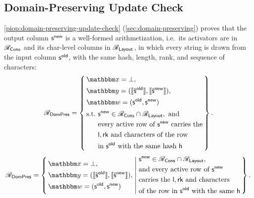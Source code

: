 \subsection{Domain-Preserving Update Check}
\label{sec:proof-domain-preserving}
\cref{piop:domain-preserving-update-check} (\cref{sec:domain-preserving}) proves that the output column $\mathsf{s}^{\mathsf{new}}$ is a well-formed arithmetization, i.e.\ its activators are in $\mathscr{R}_{\mathsf{Cons}}$ and its char-level columns in $\mathscr{R}_{\mathsf{Layout}}$, in which every string is drawn from the input column $\mathsf{s}^{\mathsf{old}}$, with the same hash, length, rank, and sequence of characters:
\ifsp
\begin{displaymath}
\NPRelation_{\mathsf{DomPres}} = \left\{\,
  \begin{aligned}
    & \NPInstance = \bot,\\
    & \NPInstancey = (\Oracle{\hat{\strcol}^{\mathsf{old}}}, \Oracle{\hat{\strcol}^{\mathsf{new}}}),\\
    & \NPWitness = (\strcol^{\mathsf{old}}, \strcol^{\mathsf{new}})\\[2pt]
    & \text{s.t.}\ \strcol^{\mathsf{new}} \in \NPRelation_{\mathsf{Cons}} \cap \NPRelation_{\mathsf{Layout}},\ \text{and}\\
    & \phantom{\text{s.t.}}\ \text{every active row of } \strcol^{\mathsf{new}} \text{ carries the}\\
    & \phantom{\text{s.t.}}\ \mathsf{l}, \mathsf{rk} \text{ and characters of the row}\\
    & \phantom{\text{s.t.}}\ \text{in } \strcol^{\mathsf{old}} \text{ with the same hash } \mathsf{h}
  \end{aligned}
\,\right\}.
\end{displaymath}
\else
\begin{displaymath}
\NPRelation_{\mathsf{DomPres}} = \left\{\,
  \begin{aligned}
    & \NPInstance = \bot,\\
    & \NPInstancey = (\Oracle{\hat{\strcol}^{\mathsf{old}}}, \Oracle{\hat{\strcol}^{\mathsf{new}}}),\\
    & \NPWitness = (\strcol^{\mathsf{old}}, \strcol^{\mathsf{new}})
  \end{aligned}
  \;\middle|\;
  \begin{aligned}
    & \strcol^{\mathsf{new}} \in \NPRelation_{\mathsf{Cons}} \cap \NPRelation_{\mathsf{Layout}}, \\
    & \text{and every active row of } \strcol^{\mathsf{new}} \\
    & \text{carries the } \mathsf{l}, \mathsf{rk} \text{ and characters} \\
    & \text{of the row in } \strcol^{\mathsf{old}} \text{ with the same } \mathsf{h}
  \end{aligned}
\,\right\}.
\end{displaymath}
\fi
{}

